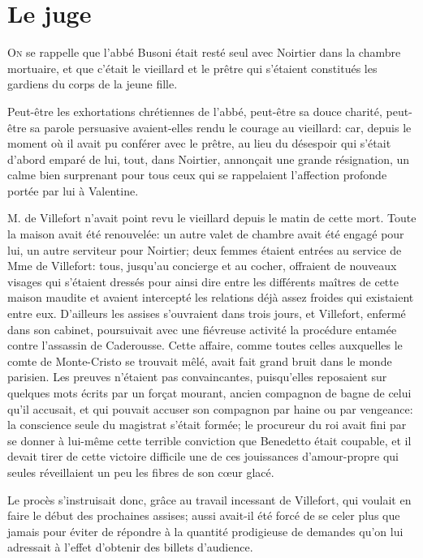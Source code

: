 \chapter{Le juge}

\lettrine{O}{n} se rappelle que l'abbé Busoni était resté seul avec Noirtier dans la chambre mortuaire, et que c'était le vieillard et le prêtre qui s'étaient constitués les gardiens du corps de la jeune fille. 

\zz
Peut-être les exhortations chrétiennes de l'abbé, peut-être sa douce charité, peut-être sa parole persuasive avaient-elles rendu le courage au vieillard: car, depuis le moment où il avait pu conférer avec le prêtre, au lieu du désespoir qui s'était d'abord emparé de lui, tout, dans Noirtier, annonçait une grande résignation, un calme bien surprenant pour tous ceux qui se rappelaient l'affection profonde portée par lui à Valentine. 

M. de Villefort n'avait point revu le vieillard depuis le matin de cette mort. Toute la maison avait été renouvelée: un autre valet de chambre avait été engagé pour lui, un autre serviteur pour Noirtier; deux femmes étaient entrées au service de Mme de Villefort: tous, jusqu'au concierge et au cocher, offraient de nouveaux visages qui s'étaient dressés pour ainsi dire entre les différents maîtres de cette maison maudite et avaient intercepté les relations déjà assez froides qui existaient entre eux. D'ailleurs les assises s'ouvraient dans trois jours, et Villefort, enfermé dans son cabinet, poursuivait avec une fiévreuse activité la procédure entamée contre l'assassin de Caderousse. Cette affaire, comme toutes celles auxquelles le comte de Monte-Cristo se trouvait mêlé, avait fait grand bruit dans le monde parisien. Les preuves n'étaient pas convaincantes, puisqu'elles reposaient sur quelques mots écrits par un forçat mourant, ancien compagnon de bagne de celui qu'il accusait, et qui pouvait accuser son compagnon par haine ou par vengeance: la conscience seule du magistrat s'était formée; le procureur du roi avait fini par se donner à lui-même cette terrible conviction que Benedetto était coupable, et il devait tirer de cette victoire difficile une de ces jouissances d'amour-propre qui seules réveillaient un peu les fibres de son cœur glacé. 

Le procès s'instruisait donc, grâce au travail incessant de Villefort, qui voulait en faire le début des prochaines assises; aussi avait-il été forcé de se celer plus que jamais pour éviter de répondre à la quantité prodigieuse de demandes qu'on lui adressait à l'effet d'obtenir des billets d'audience. 

